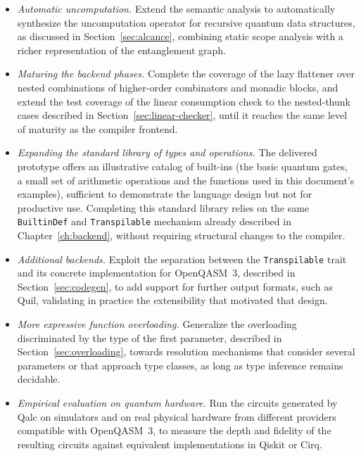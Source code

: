 \begin{itemize}
  \item \textit{Automatic uncomputation.} Extend the semantic analysis to automatically synthesize the uncomputation operator for recursive quantum data structures, as discussed in Section~\ref{sec:alcance}, combining static scope analysis with a richer representation of the entanglement graph.

  \item \textit{Maturing the backend phases.} Complete the coverage of the lazy flattener over nested combinations of higher-order combinators and monadic blocks, and extend the test coverage of the linear consumption check to the nested-thunk cases described in Section~\ref{sec:linear-checker}, until it reaches the same level of maturity as the compiler frontend.

  \item \textit{Expanding the standard library of types and operations.} The delivered prototype offers an illustrative catalog of built-ins (the basic quantum gates, a small set of arithmetic operations and the functions used in this document's examples), sufficient to demonstrate the language design but not for productive use. Completing this standard library relies on the same \lstinline|BuiltinDef| and \lstinline|Transpilable| mechanism already described in Chapter~\ref{ch:backend}, without requiring structural changes to the compiler.

  \item \textit{Additional backends.} Exploit the separation between the \lstinline|Transpilable| trait and its concrete implementation for OpenQASM~3, described in Section~\ref{sec:codegen}, to add support for further output formats, such as Quil, validating in practice the extensibility that motivated that design.

  \item \textit{More expressive function overloading.} Generalize the overloading discriminated by the type of the first parameter, described in Section~\ref{sec:overloading}, towards resolution mechanisms that consider several parameters or that approach type classes, as long as type inference remains decidable.

  \item \textit{Empirical evaluation on quantum hardware.} Run the circuits generated by Qalc on simulators and on real physical hardware from different providers compatible with OpenQASM~3, to measure the depth and fidelity of the resulting circuits against equivalent implementations in Qiskit or Cirq.
\end{itemize}
